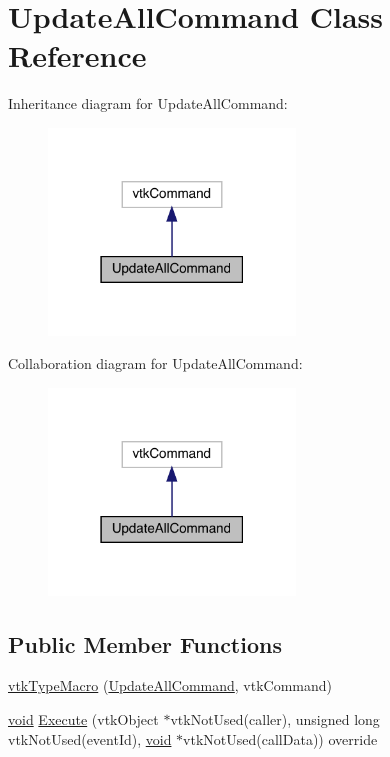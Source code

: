 \hypertarget{class_update_all_command}{}\section{Update\+All\+Command Class Reference}
\label{class_update_all_command}


Inheritance diagram for Update\+All\+Command\+:\nopagebreak
\begin{figure}[H]
\begin{center}
\leavevmode
\includegraphics[width=186pt]{class_update_all_command__inherit__graph}
\end{center}
\end{figure}


Collaboration diagram for Update\+All\+Command\+:\nopagebreak
\begin{figure}[H]
\begin{center}
\leavevmode
\includegraphics[width=186pt]{class_update_all_command__coll__graph}
\end{center}
\end{figure}
\subsection*{Public Member Functions}
\begin{DoxyCompactItemize}
\item 
\mbox{\hyperlink{class_update_all_command_a228565b2a2306d425dc7eb3cda4d39a4}{vtk\+Type\+Macro}} (\mbox{\hyperlink{class_update_all_command}{Update\+All\+Command}}, vtk\+Command)
\item 
\mbox{\hyperlink{glad_8h_a950fc91edb4504f62f1c577bf4727c29}{void}} \mbox{\hyperlink{class_update_all_command_aa836cd5d538016289656d8118da879c5}{Execute}} (vtk\+Object $\ast$vtk\+Not\+Used(caller), unsigned long vtk\+Not\+Used(event\+Id), \mbox{\hyperlink{glad_8h_a950fc91edb4504f62f1c577bf4727c29}{void}} $\ast$vtk\+Not\+Used(call\+Data)) override
\end{DoxyCompactItemize}
